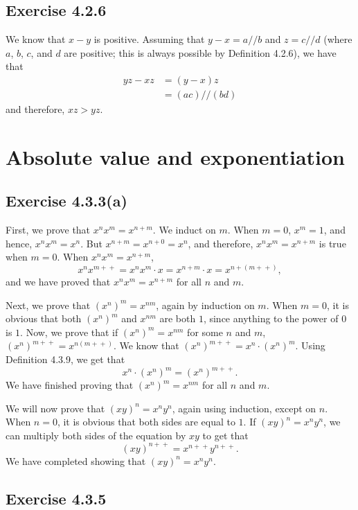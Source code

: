 \documentclass[12pt, oneside]{book}
\newcommand{\increment}{\! + \! +}
\begin{document}
	\subsection*{Exercise 4.2.6}

	We know that $x - y$ is positive. Assuming that $y - x = a // b$ and $z = c // d$ (where $a$, $b$, $c$, and $d$ are positive; this is always possible by Definition 4.2.6), we have that
	\[\begin{split}
		yz - xz &= (y - x)z \\
		&= (ac) // (bd)
	\end{split}\]
	and therefore, $xz > yz$.

	\section{Absolute value and exponentiation}

	\subsection*{Exercise 4.3.3(a)}

	First, we prove that $x^n x^m = x^{n + m}$. We induct on $m$. When $m = 0$, $x^m = 1$, and hence, $x^n x^m = x^n$. But $x^{n + m} = x^{n + 0} = x^n$, and therefore, $x^n x^m = x^{n + m}$ is true when $m = 0$. When $x^n x^m = x^{n + m}$,
	\[x^n x^{m \increment} = x^n x^m \cdot x = x^{n + m} \cdot x = x^{n + (m \increment)},\]
	and we have proved that $x^n x^m = x^{n + m}$ for all $n$ and $m$.

	Next, we prove that $(x^n)^m = x^{nm}$, again by induction on $m$. When $m = 0$, it is obvious that both $(x^n)^m$ and $x^{nm}$ are both $1$, since anything to the power of $0$ is $1$. Now, we prove that if $(x^n)^m = x^{nm}$ for some $n$ and $m$, $(x^n)^{m \increment} = x^{n(m \increment)}$. We know that $(x^n)^{m \increment} = x^n \cdot (x^n)^m$. Using Definition 4.3.9, we get that
	\[x^n \cdot (x^n)^m = (x^n)^{m \increment}.\]
	We have finished proving that $(x^n)^m = x^{nm}$ for all $n$ and $m$.

	We will now prove that $(xy)^n = x^n y^n$, again using induction, except on $n$. When $n = 0$, it is obvious that both sides are equal to $1$. If $(xy)^n = x^n y^n$, we can multiply both sides of the equation by $xy$ to get that
	\[(xy)^{n \increment} = x^{n \increment} y^{n \increment}.\]
	We have completed showing that $(xy)^n = x^n y^n$.

	\subsection*{Exercise 4.3.5}
\end{document}
